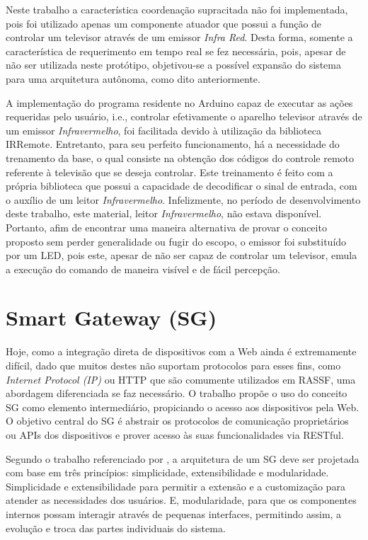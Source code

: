 \documentclass[12pt,a4paper,oneside]{report}
\begin{document}
Neste trabalho a característica coordenação supracitada não foi implementada, pois foi utilizado apenas um componente atuador que possui a função de controlar um televisor através de um emissor \emph{Infra Red}. Desta forma, somente a característica de requerimento em tempo real se fez necessária, pois, apesar de não ser utilizada neste protótipo, objetivou-se a possível expansão do sistema para uma arquitetura autônoma, como dito anteriormente.

A implementação do programa residente no Arduino capaz de executar as ações requeridas pelo usuário, i.e., controlar efetivamente o aparelho televisor através de um emissor \emph{Infravermelho}, foi facilitada devido à utilização da biblioteca IRRemote. Entretanto, para seu perfeito funcionamento, há a necessidade do trenamento da base, o qual consiste na obtenção dos códigos do controle remoto referente à televisão que se deseja controlar. Este treinamento é feito com a própria biblioteca que possui a capacidade de decodificar o sinal de entrada, com o auxílio de um leitor \emph{Infravermelho}. Infelizmente, no período de desenvolvimento deste trabalho, este material, leitor \emph{Infravermelho}, não estava disponível. Portanto, afim de encontrar uma maneira alternativa de provar o conceito proposto sem perder generalidade ou fugir do escopo, o emissor foi substituído por um LED, pois este, apesar de não ser capaz de controlar um televisor, emula a execução do comando de maneira visível e de fácil percepção.

\section{Smart Gateway (SG)}
\label{sec:sg}

Hoje, como a integração direta de dispositivos com a Web ainda é extremamente difícil, dado que muitos destes não suportam protocolos para esses fins, como \emph{Internet Protocol (IP)} ou HTTP que são comumente utilizados em RASSF, uma abordagem diferenciada se faz necessário. O trabalho \cite{wotdovad} propõe o uso do conceito SG como elemento intermediário, propiciando o acesso aos dispositivos pela Web. O objetivo central do SG é abstrair os protocolos de comunicação proprietários ou APIs dos dispositivos e prover acesso às suas funcionalidades via RESTful.

Segundo o trabalho referenciado por \cite{sgtriwiguiboh}, a arquitetura de um SG deve ser projetada com base em três princípios: simplicidade, extensibilidade e modularidade. Simplicidade e extensibilidade para permitir a extensão e a customização para atender as necessidades dos usuários. E, modularidade, para que os componentes internos possam interagir através de pequenas interfaces, permitindo assim, a evolução e troca das partes individuais do sistema.
\end{document}
